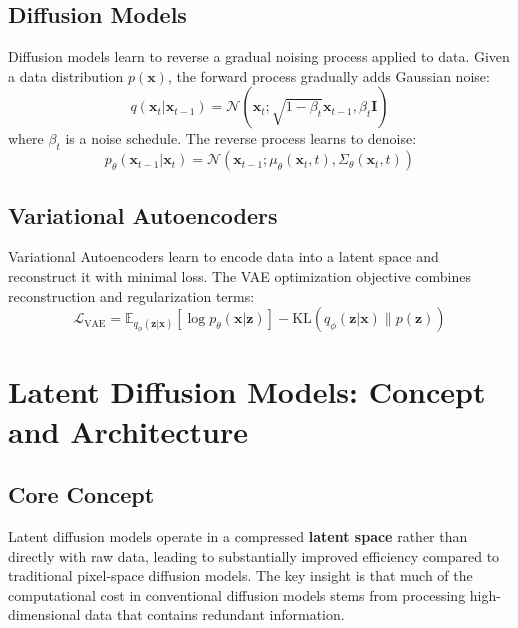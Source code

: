 \documentclass[12pt,twoside]{article}
\newcommand{\EE}{\mathbb{E}}
\newcommand{\KL}{\text{KL}}
\begin{document}
\subsection{Diffusion Models}
\label{subsec:diffusion_background}

Diffusion models learn to reverse a gradual noising process applied to data. Given a data distribution $p(\mathbf{x})$, the forward process gradually adds Gaussian noise:
\begin{equation}
\label{eq:forward_process}
q(\mathbf{x}_t | \mathbf{x}_{t-1}) = \mathcal{N}(\mathbf{x}_t; \sqrt{1-\beta_t}\mathbf{x}_{t-1}, \beta_t\mathbf{I})
\end{equation}
where $\beta_t$ is a noise schedule. The reverse process learns to denoise:
\begin{equation}
\label{eq:reverse_process}
p_\theta(\mathbf{x}_{t-1} | \mathbf{x}_t) = \mathcal{N}(\mathbf{x}_{t-1}; \mu_\theta(\mathbf{x}_t, t), \Sigma_\theta(\mathbf{x}_t, t))
\end{equation}

\subsection{Variational Autoencoders}
\label{subsec:vae_background}

Variational Autoencoders \citep{kingma2013auto} learn to encode data into a latent space and reconstruct it with minimal loss. The VAE optimization objective combines reconstruction and regularization terms:
\begin{equation}
\label{eq:vae_objective}
\mathcal{L}_{\text{VAE}} = \EE_{q_\phi(\mathbf{z}|\mathbf{x})}[\log p_\theta(\mathbf{x}|\mathbf{z})] - \KL(q_\phi(\mathbf{z}|\mathbf{x}) \| p(\mathbf{z}))
\end{equation}

\section{Latent Diffusion Models: Concept and Architecture}
\label{sec:ldm_concept}

\subsection{Core Concept}
\label{subsec:core_concept}

Latent diffusion models operate in a compressed \textbf{latent space} rather than directly with raw data, leading to substantially improved efficiency compared to traditional pixel-space diffusion models. The key insight is that much of the computational cost in conventional diffusion models stems from processing high-dimensional data that contains redundant information.
\end{document}
